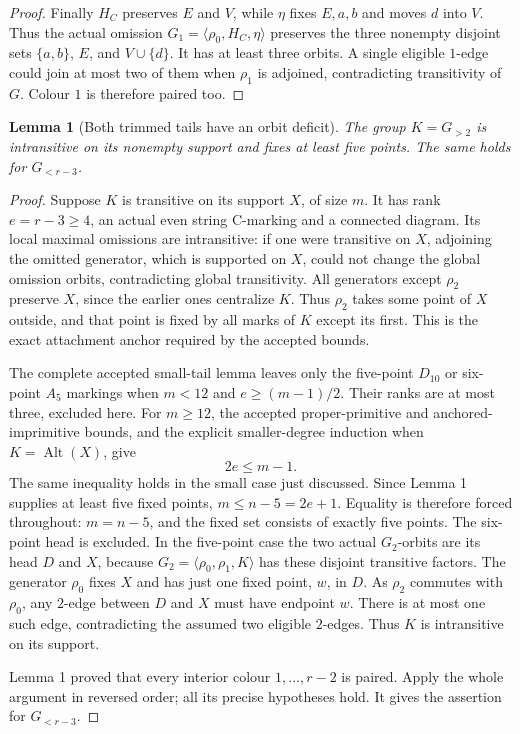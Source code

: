 \documentclass[11pt,a4paper]{article}
\newtheorem{lemma}{Lemma}
\newcommand{\gen}[1]{\langle#1\rangle}
\begin{document}
\begin{proof}
Finally $H_C$ preserves $E$ and $V$, while $\eta$ fixes $E,a,b$
and moves $d$ into $V$. Thus the actual omission
$G_1=\gen{\rho_0,H_C,\eta}$ preserves the three nonempty disjoint
sets $\{a,b\}$, $E$, and $V\cup\{d\}$.
It has at least three orbits. A single eligible $1$-edge could
join at most two of them when $\rho_1$ is adjoined, contradicting
transitivity of $G$. Colour $1$ is therefore paired too.
\end{proof}

\begin{lemma}[Both trimmed tails have an orbit deficit]
The group $K=G_{>2}$ is intransitive on its nonempty support and
fixes at least five points. The same holds for $G_{<r-3}$.
\end{lemma}
\begin{proof}
Suppose $K$ is transitive on its support $X$, of size $m$.
It has rank $e=r-3\ge4$, an actual even string C-marking and a
connected diagram. Its local maximal omissions are intransitive:
if one were transitive on $X$, adjoining the omitted generator,
which is supported on $X$, could not change the global omission
orbits, contradicting global transitivity.
All generators except $\rho_2$ preserve $X$, since the earlier
ones centralize $K$. Thus $\rho_2$ takes some point of $X$ outside,
and that point is fixed by all marks of $K$ except its first.
This is the exact attachment anchor required by the accepted bounds.

The complete accepted small-tail lemma leaves only the five-point
$D_{10}$ or six-point $A_5$ markings when $m<12$ and
$e\ge(m-1)/2$. Their ranks are at most three, excluded here.
For $m\ge12$, the accepted proper-primitive and anchored-imprimitive
bounds, and the explicit smaller-degree induction when
$K=\operatorname{Alt}(X)$, give
\[
                              2e\le m-1.
\]
The same inequality holds in the small case just discussed.
Since Lemma 1 supplies at least five fixed points,
$m\le n-5=2e+1$. Equality is therefore forced throughout:
$m=n-5$, and the fixed set consists of exactly five points.
The six-point head is excluded. In the five-point case the two
actual $G_2$-orbits are its head $D$ and $X$, because
$G_2=\gen{\rho_0,\rho_1,K}$ has these disjoint transitive factors.
The generator $\rho_0$ fixes $X$ and has just one fixed point,
$w$, in $D$. As $\rho_2$ commutes with $\rho_0$, any $2$-edge
between $D$ and $X$ must have endpoint $w$. There is at most one
such edge, contradicting the assumed two eligible $2$-edges.
Thus $K$ is intransitive on its support.

Lemma 1 proved that every interior colour $1,\ldots,r-2$ is
paired. Apply the whole argument in reversed order; all its precise
hypotheses hold. It gives the assertion for $G_{<r-3}$.
\end{proof}
\end{document}
